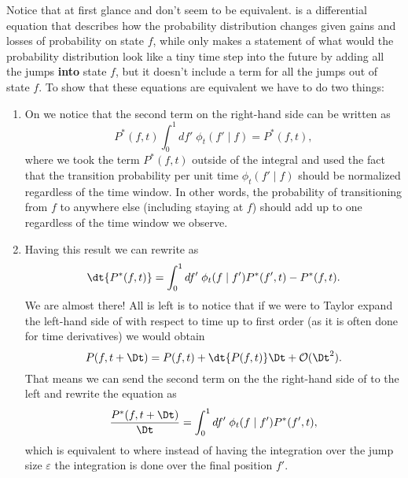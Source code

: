 Notice that at first glance  and
 don't seem to be equivalent.
 is a differential equation that describes how the
probability distribution changes given gains and losses of probability on state
$f$, while  only makes a statement of what would the
probability distribution look like a tiny time step into the future by adding
all the jumps \textbf{into} state $f$, but it doesn't include a term for all
the jumps out of state $f$. To show that these equations are equivalent we have
to do two things:
\begin{enumerate}
  \item On  we notice that the second term on the
  right-hand side can be written as
  \begin{equation}
    P^*(f, t)\int_0^1 df' \; \phi_t(f' \mid f) = P^*(f, t),
    \label{eq_integral_transition}
  \end{equation}
  where we took the term $P^*(f, t)$ outside of the integral and used the fact
  that the transition probability per unit time $\phi_t(f' \mid f)$ should be
  normalized regardless of the time window. In other words, the probability of
  transitioning from $f$ to anywhere else (including staying at $f$) should add
  up to one regardless of the time window we observe.
  \item Having this result we can rewrite  as
  \begin{equation}
    \dt{P^*(f, t)} = \int_0^1 df' \;
    \phi_t(f \mid f') P^*(f', t) - P^*(f, t).
    \label{eq_master_eq_rearange}
  \end{equation}
  We are almost there! All is left is to notice that if we were to Taylor
  expand the left-hand side of  with respect to time
  up to first order (as it is often done for time derivatives) we would obtain
  \begin{equation}
    P(f, t + \Dt) = P(f, t) + \dt{P(f, t)}\Dt + \mathcal{O}(\Dt^2).
  \end{equation}
  That means we can send the second term on the the right-hand side of
   to the left and rewrite the equation as
  \begin{equation}
    {P^*(f, t + \Dt) \over \Dt} = \int_0^1 df' \;
    \phi_t(f \mid f') P^*(f', t),
  \end{equation}
  which is equivalent to  where instead of having
  the integration over the jump size $\varepsilon$ the integration is done over
  the final position $f'$.
\end{enumerate}
